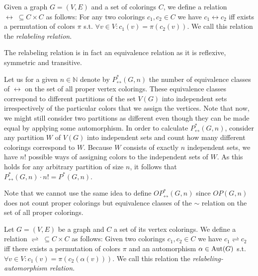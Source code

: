 \begin{highlight}
\begin{defn}
    Given a graph $G=(V,E)$ and a set of colorings $C$, we define a relation $\leftrightarrow \; \subseteq C \times C$ as follows: For any two colorings $c_1,c_2 \in C$ we have $c_1 \leftrightarrow c_2$ iff exists a permutation of colors $\pi$ s.t. $\forall v \in V : c_1(v) = \pi(c_2(v))$. We call this relation the \emph{relabeling relation}.
\end{defn}

The relabeling relation is in fact an equivalence relation as it is reflexive, symmetric and transitive.

Let us for a given $n \in \mathbb{N}$ denote by $P^*_{\leftrightarrow}(G,n)$ the number of equivalence classes of $\leftrightarrow$ on the set of all proper vertex colorings. These equivalence classes correspond to different partitions of the set $V(G)$ into independent sets irrespectively of the particular colors that we assign the vertices. Note that now, we might still consider two partitions as different even though they can be made equal by applying some automorphism. In order to calculate $P^*_{\leftrightarrow}(G,n)$, consider any partition $W$ of $V(G)$ into independent sets and count how many different colorings correspond to $W$. Because $W$ consists of exactly $n$ independent sets, we have $n!$ possible ways of assigning colors to the independent sets of $W$. As this holds for any arbitrary partition of size $n$, it follows that $P^*_{\leftrightarrow}(G,n) \cdot n! = P^*(G,n)$.

Note that we cannot use the same idea to define $OP^*_\leftrightarrow(G,n)$ since $OP(G,n)$ does not count proper colorings but equivalence classes of the $\sim$ relation on the set of all proper colorings.

\begin{defn}
    Let $G=(V,E)$ be a graph and $C$ a set of its vertex colorings. We define a relation $\rightleftharpoons \; \subseteq C \times C$ as follows: Given two colorings $c_1,c_2 \in C$ we have $c_1 \rightleftharpoons c_2$ iff there exists a permutation of colors $\pi$ and an automorphism $\alpha \in \operatorname{Aut}(G)$ s.t. $\forall v \in V : c_1(v) = \pi(c_2(\alpha(v)))$. We call this relation the \emph{relabeling-automorphism relation}.
\end{defn}


\end{highlight}